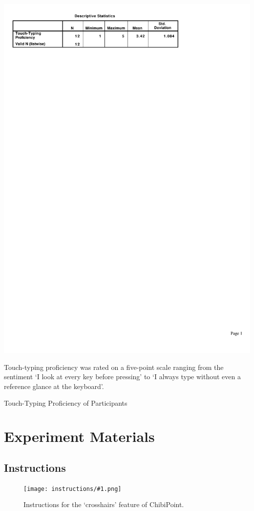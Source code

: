 \documentclass[11pt,openright,a4paper]{report}
\begin{document}
\begin{table}[ht]
\centerline{\includegraphics{figures/TouchTyping.pdf}}
\label{fig:partic_ttype}
\medskip
\small
Touch-typing proficiency was rated on a five-point scale ranging from the sentiment `I look at every key before pressing' to `I always type without even a reference glance at the keyboard'.
\caption{Touch-Typing Proficiency of Participants}
\end{table}

\section{Experiment Materials}
\subsection{Instructions}
\label{sec:instructions}
\newcommand{\instructionssheet}[1]{\centering\texttt{[image: instructions/\#1.png]}}
\begin{figure}[ht]
\instructionssheet{ChibiPointDrillInstructions}
\label{fig:instructions_crosshairs}
\caption{Instructions for the `crosshairs' feature of ChibiPoint.}
\end{figure}
\end{document}
